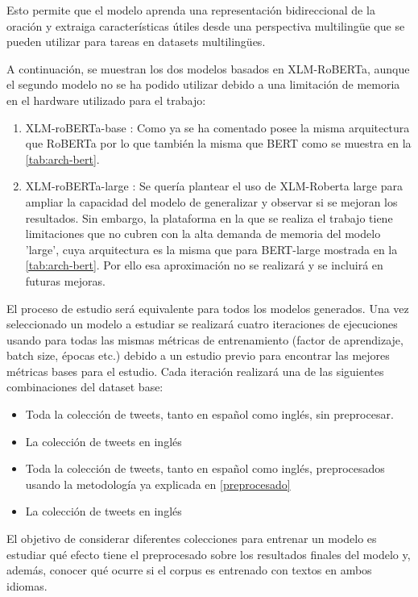 Esto permite que el modelo aprenda una representación bidireccional de la oración y extraiga características útiles desde una perspectiva multilingüe que se pueden utilizar para tareas en datasets multilingües.

A continuación, se muestran los dos modelos basados en XLM-RoBERTa, aunque el segundo modelo no se ha podido utilizar debido a una limitación de memoria en el hardware utilizado para el trabajo:
\begin{enumerate}
    \item XLM-roBERTa-base \cite{xlm-roberta-base}: Como ya se ha comentado posee la misma arquitectura que RoBERTa por lo que también la misma que BERT como se muestra en la \autoref{tab:arch-bert}.
    \item XLM-roBERTa-large \cite{xlm-roberta-large}: Se quería plantear el uso de XLM-Roberta large para ampliar la capacidad del modelo de generalizar y observar si se mejoran los resultados. Sin embargo, la plataforma en la que se realiza el trabajo tiene limitaciones que no cubren con la alta demanda de memoria del modelo ’large’, cuya arquitectura es la misma que para BERT-large mostrada en la \autoref{tab:arch-bert}. Por ello esa aproximación no se realizará y se incluirá en futuras mejoras.
\end{enumerate}


El proceso de estudio será equivalente para todos los modelos generados. Una vez seleccionado un modelo a estudiar se realizará cuatro iteraciones de ejecuciones usando para todas las mismas métricas de entrenamiento (factor de aprendizaje, batch size, épocas etc.) debido a un estudio previo para encontrar las mejores métricas bases para el estudio. 
Cada iteración realizará una de las siguientes combinaciones del dataset base:

\begin{itemize}
    \item Toda la colección de tweets, tanto en español como inglés, sin preprocesar.
    \item La colección de tweets en inglés
    \item Toda la colección de tweets, tanto en español como inglés, preprocesados usando la metodología ya explicada en \autoref{preprocesado}
    \item La colección de tweets en inglés
\end{itemize}

El objetivo de considerar diferentes colecciones para entrenar un modelo es estudiar qué efecto tiene el preprocesado sobre los resultados finales del modelo y, además, conocer qué ocurre si el corpus es entrenado con textos en ambos idiomas. 

